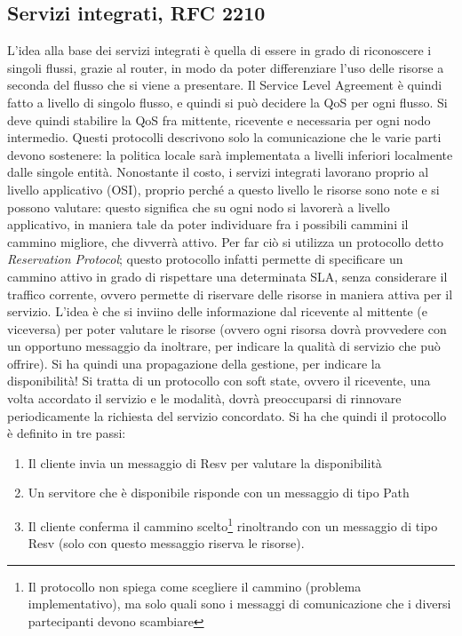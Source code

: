 \subsection{Servizi integrati, RFC 2210}
L'idea alla base dei servizi integrati è quella di essere in grado di riconoscere i singoli flussi, grazie al router, 
in modo da poter differenziare l'uso delle risorse a seconda del flusso che si viene a presentare. Il Service Level
Agreement è quindi fatto a livello di singolo flusso, e quindi si può decidere la QoS per ogni flusso. Si deve quindi
stabilire la QoS fra mittente, ricevente e necessaria per ogni nodo intermedio. Questi protocolli descrivono solo la
comunicazione che le varie parti devono sostenere: la politica locale sarà implementata a livelli inferiori localmente
dalle singole entità.
Nonostante il costo, i servizi integrati lavorano proprio al livello applicativo (OSI), proprio perché a questo 
livello le risorse sono note e si possono valutare: questo significa che su ogni nodo si lavorerà a livello applicativo,
in maniera tale da poter individuare fra i possibili cammini il cammino migliore, che divverrà attivo. Per far ciò si
utilizza un protocollo detto \textit{Reservation Protocol}; questo protocollo infatti permette di specificare un 
cammino attivo in grado di rispettare una determinata SLA, senza considerare il traffico corrente, ovvero permette di
riservare delle risorse in maniera attiva per il servizio. L'idea è che si inviino delle informazione dal ricevente al
mittente (e viceversa) per poter valutare le risorse (ovvero ogni risorsa dovrà provvedere con un opportuno messaggio
da inoltrare, per indicare la qualità di servizio che può offrire). Si ha quindi una propagazione della gestione, per
indicare la disponibilità!
Si tratta di un protocollo con soft state, ovvero il ricevente, una volta accordato il servizio e le modalità, dovrà
preoccuparsi di rinnovare periodicamente la richiesta del servizio concordato. Si ha che quindi il protocollo è 
definito in tre passi:
\begin{enumerate}
 \item Il cliente invia un messaggio di Resv per valutare la disponibilità 
 \item Un servitore che è disponibile risponde con un messaggio di tipo Path
 \item Il cliente conferma il cammino scelto\footnote{Il protocollo non spiega come scegliere il cammino (problema
 implementativo), ma solo quali sono i messaggi di comunicazione che i diversi partecipanti devono scambiare}
 rinoltrando con un messaggio di tipo Resv (solo con questo messaggio riserva le risorse).
\end{enumerate}
